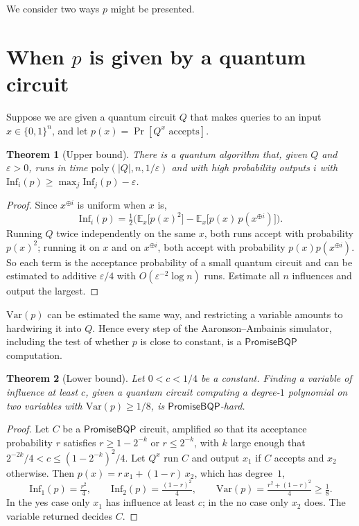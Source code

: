 \documentclass[11pt]{article}
\newtheorem{theorem}{Theorem}
\theoremstyle{remark}
\newcommand{\Inf}{\mathrm{Inf}}
\newcommand{\Var}{\mathrm{Var}}
\newcommand{\E}{\mathbb{E}}
\newcommand{\poly}{\mathrm{poly}}
\newcommand{\PromiseBQP}{\mathsf{PromiseBQP}}
\begin{document}
We consider two ways $p$ might be presented.

\section{When \texorpdfstring{$p$}{p} is given by a quantum circuit}

Suppose we are given a quantum circuit $Q$ that makes queries to an input
$x\in\{0,1\}^n$, and let $p(x)=\Pr[Q^x\text{ accepts}]$.

\begin{theorem}[Upper bound]\label{thm:circuit-upper}
There is a quantum algorithm that, given $Q$ and $\varepsilon>0$, runs in time
$\poly(|Q|,n,1/\varepsilon)$ and with high probability outputs $i$ with
$\Inf_i(p)\ge\max_j\Inf_j(p)-\varepsilon$.
\end{theorem}

\begin{proof}
Since $x^{\oplus i}$ is uniform when $x$ is,
\[
\Inf_i(p)=\tfrac12\Big(\E_x\big[p(x)^2\big]-\E_x\big[p(x)\,p(x^{\oplus i})\big]\Big).
\]
Running $Q$ twice independently on the same $x$, both runs accept with probability
$p(x)^2$; running it on $x$ and on $x^{\oplus i}$, both accept with probability
$p(x)p(x^{\oplus i})$. So each term is the acceptance probability of a small quantum
circuit and can be estimated to additive $\varepsilon/4$ with $O(\varepsilon^{-2}\log n)$
runs. Estimate all $n$ influences and output the largest.
\end{proof}

$\Var(p)$ can be estimated the same way, and restricting a variable amounts to hardwiring
it into $Q$. Hence every step of the Aaronson--Ambainis simulator, including the test of
whether $p$ is close to constant, is a $\PromiseBQP$ computation.

\begin{theorem}[Lower bound]\label{thm:circuit-lower}
Let $0<c<1/4$ be a constant. Finding a variable of influence at least $c$, given a quantum
circuit computing a degree-$1$ polynomial on two variables with $\Var(p)\ge1/8$, is
$\PromiseBQP$-hard.
\end{theorem}

\begin{proof}
Let $C$ be a $\PromiseBQP$ circuit, amplified so that its acceptance probability $r$
satisfies $r\ge1-2^{-k}$ or $r\le2^{-k}$, with $k$ large enough that $2^{-2k}/4<c\le(1-2^{-k})^2/4$.
Let $Q^x$ run $C$ and output $x_1$ if $C$ accepts and $x_2$ otherwise. Then
$p(x)=r\,x_1+(1-r)\,x_2$, which has degree~$1$,
\[
\Inf_1(p)=\tfrac{r^2}{4},\qquad \Inf_2(p)=\tfrac{(1-r)^2}{4},\qquad
\Var(p)=\tfrac{r^2+(1-r)^2}{4}\ge\tfrac18 .
\]
In the yes case only $x_1$ has influence at least $c$; in the no case only $x_2$ does.
The variable returned decides $C$.
\end{proof}
\end{document}
